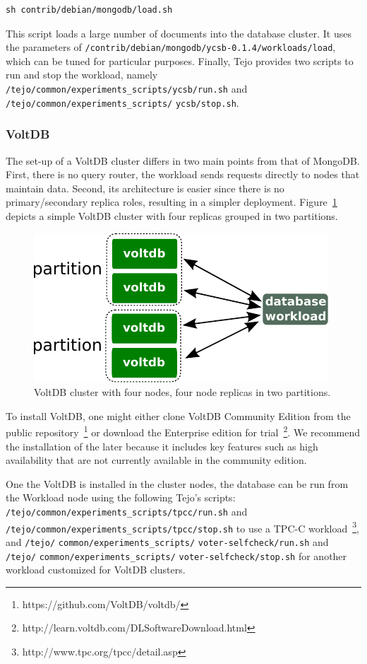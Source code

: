 \begin{lstlisting}
sh contrib/debian/mongodb/load.sh
\end{lstlisting}

This script loads a large number of documents into the database cluster. It uses the parameters of \verb|/contrib/debian/mongodb/ycsb-0.1.4/workloads/load|, which can be tuned for particular purposes. Finally, Tejo provides two scripts to run and stop the workload, namely \verb|/tejo/common/experiments_scripts/ycsb/run.sh| and \verb|/tejo/common/experiments_scripts/| \verb|ycsb/stop.sh|.


\subsubsection{VoltDB}

The set-up of a VoltDB cluster differs in two main points from that of MongoDB. First, there is no query router, the workload sends requests directly to nodes that maintain data. Second, its architecture is easier since there is no primary/secondary replica roles, resulting in a simpler deployment. Figure~\ref{fig:voltdb_cluster} depicts a simple VoltDB cluster with four replicas grouped in two partitions.

\begin{figure}[!h]
  \centering
     \includegraphics[width=.6\textwidth]{inputs/img/voltdb_cluster}
  \caption{VoltDB cluster with four nodes, four node replicas in two partitions.}
  \label{fig:voltdb_cluster}
\end{figure}

To install VoltDB, one might either clone VoltDB Community Edition from the public repository~\footnote{https://github.com/VoltDB/voltdb/} or download the Enterprise edition for trial~\footnote{http://learn.voltdb.com/DLSoftwareDownload.html}. We recommend the installation of the later because it includes key features such as high availability that are not currently available in the community edition.

One the VoltDB is installed in the cluster nodes, the database can be run from the Workload node using the following Tejo's scripts: \verb|/tejo/common/experiments_scripts/tpcc/run.sh| and \verb|/tejo/common/experiments_scripts/tpcc/stop.sh| to use a TPC-C workload~\footnote{http://www.tpc.org/tpcc/detail.asp}, and \verb|/tejo/| \verb|common/experiments_scripts/| \verb|voter-selfcheck/run.sh| and \verb|/tejo/| \verb|common/experiments_scripts/| \verb|voter-selfcheck/stop.sh| for another workload customized for VoltDB clusters.


